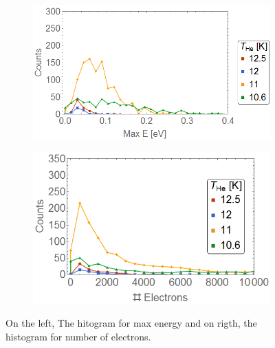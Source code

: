 \documentclass[a4paper,12pt,bibtotocnumbered, twosite]{scrreprt}
\begin{document}
\begin{figure}[h!]
\centering
\begin{subfigure}[l]{0.49\textwidth}
\includegraphics[width=1\textwidth]{../Images/results/Mir_He_Dropletsize/Henerg.png}   				\end{subfigure}
\begin{subfigure}[l]{0.49\textwidth}
\includegraphics[width=1\textwidth]{../Images/results/Mir_He_Dropletsize/Helec.png} 
\end{subfigure}
\caption[MIR He droplet scan histograms]{On the left, The hitogram for max energy and on rigth, the histogram for number of electrons.}
\label{fig:histodropletsize}
\end{figure}
\end{document}
